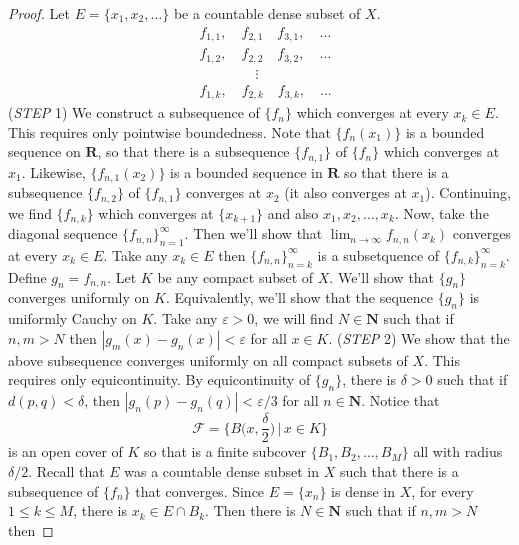 \vspace{2ex}
\begin{proof}
 Let $E=\{x_1,x_2,\ldots  \}$ be a countable dense subset of $X$.
\begin{align*}
&f_{1,1},\quad f_{2,1}\quad f_{3,1},\quad \ldots\\
&f_{1,2},\quad f_{2,2}\quad f_{3,2},\quad \ldots \\
&\qquad\qquad \vdots\\
&f_{1,k},\quad f_{2,k}\quad f_{3,k},\quad \ldots
\end{align*}
({\it STEP} 1) We construct a subsequence of $\{f_{n}\}$ which converges at every $x_{k}\in E$. This requires only pointwise boundedness. Note that $\{f_{n}(x_1)\}$ is a bounded sequence on ${\bm R}$, so that there is a subsequence $\{f_{n,1}\}$ of $\{f_{n}\}$ which converges at $x_1$. Likewise, $\{f_{n,1}(x_2)\}$ is a bounded sequence in ${\bm R}$ so that there is a subsequence $\{f_{n,2}\}$ of $\{f_{n,1}\}$ converges at $x_2$ (it also converges at $x_1$). Continuing, we find $\{f_{n,k}\}$ which converges at $\{x_{k+1}\}$ and also $x_1,x_2,\ldots, x_{k}$. Now, take the diagonal sequence $\{f_{n,n}\}^{\infty }_{n=1}$. Then we'll show that $\lim _{n\rightarrow \infty }f_{n,n}(x_{k})$ converges at every $x_{k}\in E$. Take any $x_{k}\in E$ then $\{f_{n,n}\}^{\infty }_{n=k}$ is a subsetquence of $\{f_{n,k}\}^{\infty }_{n=k}$.
\newline
\newline
Define $g_{n}=f_{n,n}$. Let $K$ be any compact subset of $X$. We'll show that $\{g_{n}\}$ converges uniformly on $K$. Equivalently, we'll show that the sequence $\{g_{n}\}$ is uniformly Cauchy on $K$. Take any $\varepsilon >0$, we will find $N\in {\bm N}$ such that if $n,m>N$ then $|g_{m}(x)-g_{n}(x)|<\varepsilon $ for all $x\in K$.
\newline
\newline
({\it STEP} 2) We show that the above subsequence converges uniformly on all compact subsets of $X$. This requires only equicontinuity. By equicontinuity of $\{g_{n}\}$, there is $\delta>0$ such that if $d(p,q)<\delta $, then $|g_{n}(p)-g_{n}(q)|<\varepsilon/3 $ for all $n\in {\bm N}$. Notice that
\[\mathcal{F}=\Big\{B\Big(x,\dfrac{\delta }{2}\Big) \,\Big|\,x\in K \Big\}\]
is an open cover of $K$ so that is a finite subcover $\{B_1,B_2,\ldots ,B_{M}\}$ all with radius $\delta /2$. Recall that $E$ was a countable dense subset in $X$ such that there is a subsequence of $\{f_{n}\}$ that converges. Since $E=\{x_{n}\}$ is dense in $X$, for every $1\leq k\leq M$, there is $x_{k}\in E\cap B_{k}$. Then there is $N\in {\bm N}$ such that if $n,m>N$ then

\end{proof}
